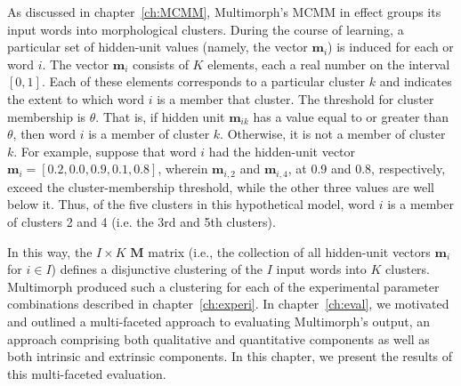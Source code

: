 As discussed in chapter~\ref{ch:MCMM}, Multimorph's \ac{MCMM} in effect groups its input words into morphological clusters. 
During the course of learning, a particular set of hidden-unit values (namely, the vector $\mathbf{m}_{i}$) is induced for each or word $i$. 
The vector $\mathbf{m}_{i}$ consists of $K$ elements, each a real number on the interval $[0,1]$. 
Each of these elements corresponds to a particular cluster $k$ and indicates the extent to which word $i$ is a member that cluster.
The threshold for cluster membership is $\theta$. That is, if hidden unit $\mathbf{m}_{ik}$ has a value equal to or greater than 
$\theta$, then word $i$ is a member of cluster $k$. Otherwise, it is not a member of cluster $k$. 
For example, suppose that word $i$ had the hidden-unit vector $\mathbf{m}_{i} = [0.2, 0.0,0.9,0.1,0.8]$, 
wherein $\mathbf{m}_{i,2}$ and $\mathbf{m}_{i,4}$, at 0.9 and 0.8, respectively, exceed the cluster-membership 
threshold, while the other three values
are well below it. Thus, of the five clusters in this hypothetical model, word $i$ is a member of clusters 
2 and 4 (i.e. the 3rd and 5th clusters).

In this way, the $I \times K$ $\mathbf{M}$ matrix (i.e., the collection of all hidden-unit vectors $\mathbf{m}_i$ for $i \in I$) 
defines a disjunctive clustering of the $I$ input words into $K$ clusters. Multimorph produced such a clustering for 
each of the experimental parameter combinations described in chapter~\ref{ch:experi}. In chapter~\ref{ch:eval}, 
we motivated and outlined a multi-faceted approach to evaluating Multimorph's output, an approach comprising 
both qualitative and quantitative components as well as both intrinsic and extrinsic components. 
In this chapter, we present the results of this multi-faceted evaluation. 


